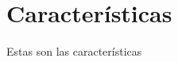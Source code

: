 \documentclass[../main.tex]{subfiles}
\begin{document}
\section{Características}
Estas son las características
\clearpage
\end{document}
